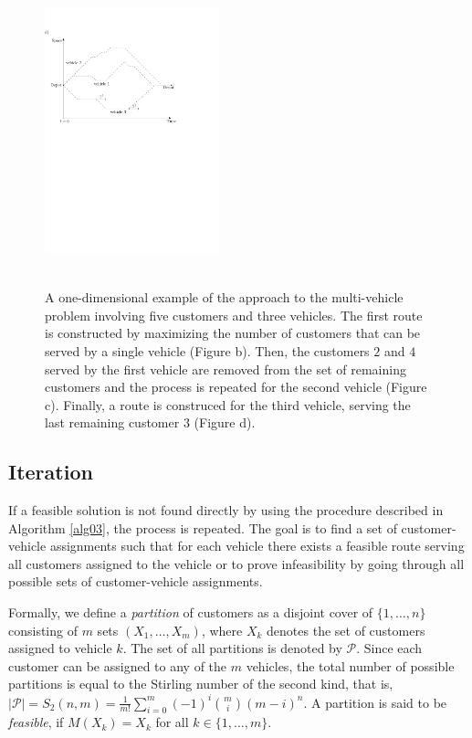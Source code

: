 \documentclass[dissertation,draft*]{aaltoseries}
\begin{document}
\begin{figure}[ht]
\includegraphics[width=0.45\textwidth]{greedy07b.pdf}  \\ \ \\   
\caption{A one-dimensional example of the approach to the multi-vehicle problem involving five customers 
and three vehicles. The first route is constructed by maximizing 
the number of customers that can be served by a single vehicle (Figure b). 
Then, the customers $2$ and $4$ served by the first vehicle are removed from the set of remaining customers and the process 
is repeated for the second vehicle (Figure c). Finally, a route is construced for the third vehicle, serving the
last remaining customer $3$ (Figure d).
}
\label{greedyidea}
\end{figure}

\subsection{Iteration}
\label{iteration}
If a feasible solution is not found directly by using the procedure described in Algorithm \ref{alg03}, 
the process is repeated. The goal is to find a set of customer-vehicle assignments 
such that for each vehicle there exists a feasible route serving all customers assigned to the vehicle
or to prove infeasibility by going through all possible sets of customer-vehicle assignments.

Formally, we define a \emph{partition} of customers as a disjoint cover of $\{1,\ldots,n\}$ consisting of $m$ sets $(X_1,\ldots,X_m)$,
where $X_k$ denotes the set of customers assigned to vehicle $k$.
The set of all partitions is denoted by $\mathcal{P}$. Since each customer can be assigned to any of the $m$ vehicles, the total 
number of possible partitions is equal to the Stirling number of the second kind, that is,
$|\mathcal{P}| = S_2(n,m) = \frac {1}{m!} \sum_{i=0}^{m} (-1)^i {m \choose i} (m-i)^n$.
A partition is said to be \emph{feasible}, if $M(X_k) = X_k$ for all $k \in \{1,\ldots,m\}$.
\end{document}
